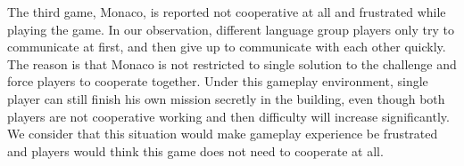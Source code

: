 The third game, Monaco, is reported not cooperative at all and frustrated while playing the game. In our observation, different language group players only try to communicate at first, and then give up to communicate with each other quickly. The reason is that Monaco is not restricted to single solution to the challenge and force players to cooperate together. Under this gameplay environment, single player can still finish his own mission secretly in the building, even though both players are not cooperative working and then difficulty will increase significantly. We consider that this situation would make gameplay experience be frustrated and players would think this game does not need to cooperate at all.




